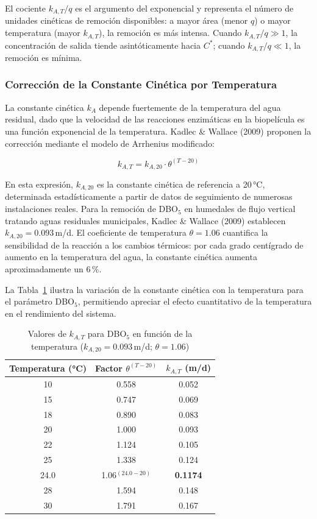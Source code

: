 \documentclass[12pt,a4paper]{article}
\newcommand{\captionequation}[1]{}
\begin{document}
El cociente $k_{A,T}/q$ es el argumento del exponencial y representa el número de unidades cinéticas de remoción disponibles: a mayor área (menor $q$) o mayor temperatura (mayor $k_{A,T}$), la remoción es más intensa. Cuando $k_{A,T}/q \gg 1$, la concentración de salida tiende asintóticamente hacia $C^*$; cuando $k_{A,T}/q \ll 1$, la remoción es mínima.

\subsubsection*{Corrección de la Constante Cinética por Temperatura}

La constante cinética $k_A$ depende fuertemente de la temperatura del agua residual, dado que la velocidad de las reacciones enzimáticas en la biopelícula es una función exponencial de la temperatura. Kadlec \& Wallace (2009) proponen la corrección mediante el modelo de Arrhenius modificado:

\begin{equation}
k_{A,T} = k_{A,20} \cdot \theta^{(T-20)}
\label{eq:arrhenius}
\end{equation}
\captionequation{Corrección de la constante cinética por temperatura -- Ecuación de Arrhenius modificada (Kadlec \& Wallace, 2009)}

En esta expresión, $k_{A,20}$ es la constante cinética de referencia a 20\,°C, determinada estadísticamente a partir de datos de seguimiento de numerosas instalaciones reales. Para la remoción de DBO$_5$ en humedales de flujo vertical tratando aguas residuales municipales, Kadlec \& Wallace (2009) establecen $k_{A,20} = 0.093$\,m/d. El coeficiente de temperatura $\theta = 1.06$ cuantifica la sensibilidad de la reacción a los cambios térmicos: por cada grado centígrado de aumento en la temperatura del agua, la constante cinética aumenta aproximadamente un 6\,\%.

La Tabla~\ref{tab:kAT_temperatura} ilustra la variación de la constante cinética con la temperatura para el parámetro DBO$_5$, permitiendo apreciar el efecto cuantitativo de la temperatura en el rendimiento del sistema.

\begin{table}[H]
\centering
\caption{Valores de $k_{A,T}$ para DBO$_5$ en función de la temperatura ($k_{A,20} = 0.093$\,m/d; $\theta = 1.06$)}
\label{tab:kAT_temperatura}
\begin{tabular}{ccc}
\toprule
\textbf{Temperatura (°C)} & \textbf{Factor $\theta^{(T-20)}$} & \textbf{$k_{A,T}$ (m/d)} \\
\midrule
10 & 0.558 & 0.052 \\
15 & 0.747 & 0.069 \\
18 & 0.890 & 0.083 \\
20 & 1.000 & 0.093 \\
22 & 1.124 & 0.105 \\
25 & 1.338 & 0.124 \\
24.0 & 1.06$^{(24.0-20)}$ & \textbf{0.1174} \\
28 & 1.594 & 0.148 \\
30 & 1.791 & 0.167 \\
\bottomrule
\end{tabular}
\end{table}
\end{document}
